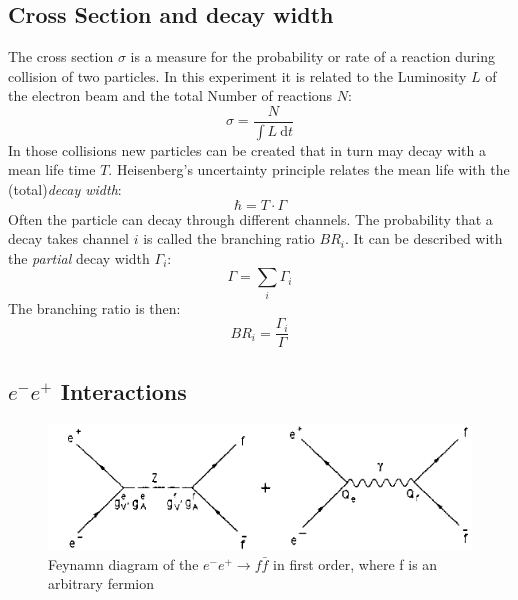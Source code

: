 \subsection{Cross Section and decay width}
The cross section $\sigma$ is a measure for the probability or rate of a reaction during collision of two particles. In this experiment it is related to the Luminosity $L$ of the electron beam and the total Number of reactions $N$:
\begin{equation}
\sigma = \frac{N}{\int L~\text{d}t}
\end{equation}
In those collisions new particles can be created that in turn may decay with a mean life time $T$.
Heisenberg's uncertainty principle relates the mean life with the (total)\emph{decay width}:
\begin{equation}
\hbar=T\cdot\Gamma
\end{equation}
Often the particle can decay through different channels. The probability that a decay takes channel $i$ is called the branching ratio $BR_i$. It can be described with the \emph{partial} decay width $\Gamma_i$:
\begin{equation}
\Gamma = \sum_i \Gamma_i
\end{equation}
The branching ratio is then:
\begin{equation}
BR_i=\frac{\Gamma_i}{\Gamma}
\label{eq:principles:branching ratio}
\end{equation}

\subsection{$e^-e^+$ Interactions}
\label{sec:ee interaction}
\begin{figure}[ht]
	\centering
	\includegraphics{graphics/annihilation.png}
	\caption{Feynamn diagram of the $e^-e^+ \rightarrow f\bar{f}$ in first order, where f is an arbitrary fermion}
	\label{fig:principles:annihilation.png}
\end{figure}

